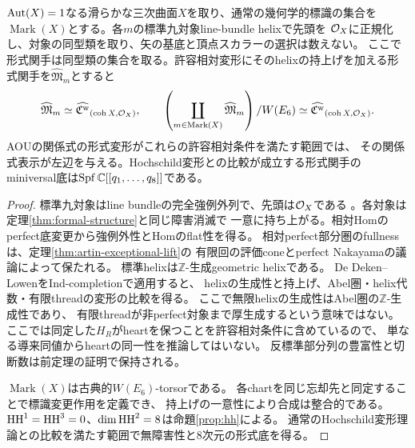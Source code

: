 \begin{theorem}[通常の標識に限った形式Weyl商]\label{thm:formal-weyl}
$\operatorname{Aut}(X)=1$なる滑らかな三次曲面$X$を取り、通常の幾何学的標識の集合を
$\operatorname{Mark}(X)$とする。各$m$の標準九対象line-bundle helixで先頭を
$\mathcal O_X$に正規化し、対象の同型類を取り、矢の基底と頂点スカラーの選択は数えない。
ここで形式関手は同型類の集合を取る。許容相対変形にそのhelixの持上げを加える形式関手を$\widehat{\mathfrak M}_m$とすると
\[
 \widehat{\mathfrak M}_m\simeq\widehat{\mathfrak C^{\rm w}}_{(\operatorname{coh}X,\mathcal O_X)},\qquad
 \left(\coprod_{m\in\operatorname{Mark}(X)}\widehat{\mathfrak M}_m\right)/W(E_6)
 \simeq\widehat{\mathfrak C^{\rm w}}_{(\operatorname{coh}X,\mathcal O_X)}.
\]
AOUの関係式の形式変形がこれらの許容相対条件を満たす範囲では、
その関係式表示が左辺を与える。Hochschild変形との比較が成立する形式関手の
miniversal底は$\operatorname{Spf}\mathbb C[[q_1,\ldots,q_8]]$である。
\end{theorem}
\begin{proof}
標準九対象はline bundleの完全強例外列で、先頭は$\mathcal O_X$である
\cite[(4.1), (9.44)]{AOU}。各対象は定理\ref{thm:formal-structure}と同じ障害消滅で
一意に持ち上がる。相対Homのperfect底変更から強例外性とHomのflat性を得る。
相対perfect部分圏のfullnessは、定理\ref{thm:artin-exceptional-lift}の
有限回の評価coneとperfect Nakayamaの議論によって保たれる。
標準helixは$\mathbb Z$-生成geometric helixである。
De Deken--Lowen\cite[Theorems 4.5, 5.13, 5.15]{DDL}をInd-completionで適用すると、
helixの生成性と持上げ、Abel圏・helix代数・有限threadの変形の比較を得る。
ここで無限helixの生成性はAbel圏の$\mathbb Z$-生成性であり、
有限threadが非perfect対象まで厚生成するという意味ではない。
ここでは同定した$H_R$がheartを保つことを許容相対条件に含めているので、
単なる導来同値からheartの同一性を推論してはいない。
反標準部分列の豊富性と切断数は前定理の証明で保持される。

$\operatorname{Mark}(X)$は古典的$W(E_6)$-torsorである\cite[\S2.3]{AOU}。
各chartを同じ忘却先と同定することで標識変更作用を定義でき、
持上げの一意性により合成は整合的である。
$\operatorname{HH}^1=\operatorname{HH}^3=0$、$\dim\operatorname{HH}^2=8$は命題\ref{prop:hh}による。
通常のHochschild変形理論との比較を満たす範囲で無障害性と8次元の形式底を得る。
\end{proof}

